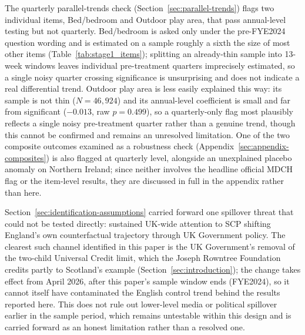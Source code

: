 The quarterly parallel-trends check (Section~\ref{sec:parallel-trends}) flags two individual items, Bed/bedroom and Outdoor play area, that pass annual-level testing but not quarterly. Bed/bedroom is asked only under the pre-FYE2024 question wording and is estimated on a sample roughly a sixth the size of most other items (Table~\ref{tab:stage1_items}); splitting an already-thin sample into 13-week windows leaves individual pre-treatment quarters imprecisely estimated, so a single noisy quarter crossing significance is unsurprising and does not indicate a real differential trend. Outdoor play area is less easily explained this way: its sample is not thin ($N=46{,}924$) and its annual-level coefficient is small and far from significant ($-0.013$, raw $p=0.499$), so a quarterly-only flag most plausibly reflects a single noisy pre-treatment quarter rather than a genuine trend, though this cannot be confirmed and remains an unresolved limitation. One of the two composite outcomes examined as a robustness check (Appendix~\ref{sec:appendix-composites}) is also flagged at quarterly level, alongside an unexplained placebo anomaly on Northern Ireland; since neither involves the headline official MDCH flag or the item-level results, they are discussed in full in the appendix rather than here.
 
Section~\ref{sec:identification-assumptions} carried forward one spillover threat that could not be tested directly: sustained UK-wide attention to SCP shifting England's own counterfactual trajectory through UK Government policy. The clearest such channel identified in this paper is the UK Government's removal of the two-child Universal Credit limit, which the Joseph Rowntree Foundation credits partly to Scotland's example (Section~\ref{sec:introduction}); the change takes effect from April 2026, after this paper's sample window ends (FYE2024), so it cannot itself have contaminated the English control trend behind the results reported here. This does not rule out lower-level media or political spillover earlier in the sample period, which remains untestable within this design and is carried forward as an honest limitation rather than a resolved one.
 
